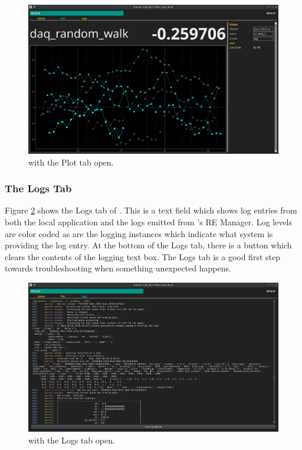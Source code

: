 \begin{landscape}
\begin{figure}
\includegraphics[width=9in]{"acquisition/images/plot_tab"}
\caption[The Plot Tab]{
	\blueskycmds with the Plot tab open.
}
\label{acq:fig:log_tab}
\end{figure}
\end{landscape}

\subsubsection{The Logs Tab}

Figure \ref{acq:fig:log_tab} shows the Logs tab of \blueskycmds.
This is a text field which shows log entries from both the local application and the logs emitted from \biab's RE Manager.
Log levels are color coded as are the logging instances which indicate what system is providing the log entry.
At the bottom of the Logs tab, there is a button which clears the contents of the logging text box.
The Logs tab is a good first step towards troubleshooting when something unexpected happens.

\begin{landscape}
\begin{figure}
\includegraphics[width=9in]{"acquisition/images/log_tab"}
\caption[The Log Tab]{
	\blueskycmds with the Logs tab open.
}
\label{acq:fig:log_tab}
\end{figure}
\end{landscape}

